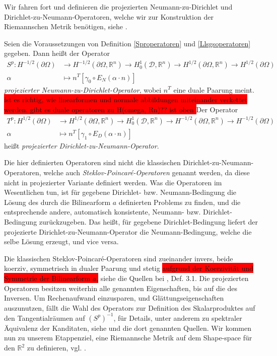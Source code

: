 Wir fahren fort und definieren die projezierten Neumann-zu-Dirichlet und Dirichlet-zu-Neumann-Operatoren, welche wir zur Konstruktion der Riemannschen Metrik benötigen, siehe \cite{bfgs2}.

\begin{defi}\label{Randoperatoren}
Seien die Voraussetzungen von Definition \ref{Sproperatoren} und \ref{Llsgsoperatoren} gegeben. Dann heißt der Operator
\begin{align*}
	S^p: H^{-1/2}(\partial\Omega) &\rightarrow H^{-1/2}(\partial\Omega, \mathbb{R}^n) \rightarrow H^1_0(\mathcal{D},\mathbb{R}^n) \rightarrow H^{1/2}(\partial\Omega, \mathbb{R}^n) \rightarrow H^{1/2}(\partial\Omega) \\
	\alpha &\mapsto n^T[\gamma_0 \circ E_N(\alpha \cdot n)]
\end{align*}
\textit{projezierter Neumann-zu-Dirichlet-Operator}, wobei $n^T$ eine duale Paarung meint.
\colorbox{red}{ist es richtig, wie linearformen und normale abbildungen miteinander verkettet werden. gibt es duale operatoren zu H(omega, Rn)?? ist oben  }
Der Operator
\begin{align*}
	T^p: H^{1/2}(\partial\Omega) &\rightarrow H^{1/2}(\partial\Omega,\mathbb{R}^n) \rightarrow H^1_0(\mathcal{D},\mathbb{R}^n) \rightarrow H^{-1/2}(\partial\Omega,\mathbb{R}^n) \rightarrow H^{-1/2}(\partial\Omega) \\
	\alpha &\mapsto n^T[\gamma_1 \circ E_D(\alpha \cdot n)]
\end{align*}
heißt \textit{projezierter Dirichlet-zu-Neumann-Operator}.
\end{defi}



Die hier definierten Operatoren sind nicht die klassischen Dirichlet-zu-Neumann-Operatoren, welche auch \textit{Steklov-Poincaré-Operatoren} genannt werden, da diese nicht in projezierter Variante definiert werden. Was die Operatoren im Wesentlichen tun, ist für gegebene Dirichlet- bzw. Neumann-Bedingung die Lösung des durch die Bilinearform $a$ definierten Problems zu finden, und die entsprechende andere, automatisch konsistente, Neumann- bzw. Dirichlet-Bedingung zurückzugeben. Das heißt, für gegebene Dirichlet-Bedingung liefert der projezierte Dirichlet-zu-Neumann-Operator die Neumann-Bedingung, welche die selbe Lösung erzeugt, und vice versa.

Die klassischen Steklov-Poincaré-Operatoren sind zueinander invers, beide koerziv, symmetrisch in dualer Paarung und stetig \colorbox{red}{aufgrund der Koerzivität und Symmetrie der Bilinearform $a$,} siehe die Quellen bei \cite{bfgs2}, Def. 3.1. Die projezierten Operatoren besitzen weiterhin alle genannten Eigenschaften, bis auf die des Inversen. Um Rechenaufwand einzusparen, und Glättungseigenschaften auszunutzen, fällt die Wahl des Operators zur Definition des Skalarproduktes auf den Tangentialräumen auf $(S^p)^{-1}$, für Details, unter anderem zu spektraler Äquivalenz der Kanditaten, siehe \cite{bfgs1} und die dort genannten Quellen. Wir kommen nun zu unserem Etappenziel, eine Riemannsche Metrik auf dem Shape-space für den $\mathbb{R}^2$ zu definieren, vgl. \cite{bfgs2}.

